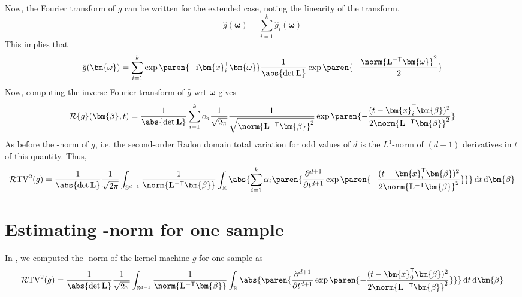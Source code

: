 Now, the Fourier transform of $g$ can be written for the extended case, noting the linearity of the transform,
\[
 \hat{g}(\bm{\omega}) = \sum_{i=1}^k \hat{g}_i(\bm{\omega})
\]
This implies that 
\[
 \hat{g}(\bm{\omega}) = \sum_{i =1}^k \exp\paren{-\mathrm{i}\bm{x}_i^\mathsf{T}\bm{\omega}} \frac{1}{\abs{\det \mathbf{L}}} \exp\paren{-\frac{\norm{\mathbf{L}^{-\mathsf{T}} \bm{\omega}}^2}{2}}
\]
Now, computing the inverse Fourier transform of $\hat{g}$ wrt $\bm{\omega}$ gives 
\[
\mathcal{R}\{g\}(\bm{\beta}, t) = \frac{1}{\abs{\det \mathbf{L}}} \sum_{i=1}^k \alpha_i \frac{1}{\sqrt{2\pi}} \frac{1}{\sqrt{\norm{\mathbf{L}^{-\mathsf{T}}\bm{\beta}}^2}} \exp\paren{-\frac{(t- \bm{x}_i^\mathsf{T}\bm{\beta})^2}{2\norm{\mathbf{L}^{-\mathsf{T}}\bm{\beta}}^2}}
\]
As before the -norm of $g$, i.e. the second-order Radon domain total variation for odd values of $d$ is the $L^1$-norm of $(d+1)$ derivatives in $t$ of this quantity. Thus,
\[
\mathcal{R}\mathrm{TV}^2(g) = \frac{1}{\abs{\det \mathbf{L}}} \frac{1}{\sqrt{2\pi}} \int_{\mathbb{S}^{d-1}} \frac{1}{{\norm{\mathbf{L}^{-\mathsf{T}}\bm{\beta}}}} 
    \int_\mathbb{R}
    \abs{\sum_{i=1}^k \alpha_i \paren{\frac{\partial^{d+1}}{\partial t^{d+1}} \exp\paren{-\frac{(t-\bm{x}_i^\mathsf{T}\bm{\beta})^2}{2\norm{\mathbf{L}^{-\mathsf{T}}\bm{\beta}}^2}}}} \,\mathrm{d}t\,\mathrm{d}\bm{\beta}
\]

\iffalse
\section{Estimating -norm for one sample}

In , we computed the -norm of the kernel machine $g$ for one sample as
\begin{equation}
\mathcal{R}\mathrm{TV}^2(g) = \frac{1}{\abs{\det \mathbf{L}}} \frac{1}{\sqrt{2\pi}} \int_{\mathbb{S}^{d-1}} \frac{1}{{\norm{\mathbf{L}^{-\mathsf{T}}\bm{\beta}}}} 
    \int_\mathbb{R}
    \abs{ \paren{\frac{\partial^{d+1}}{\partial t^{d+1}} \exp\paren{-\frac{(t-\bm{x}_0^\mathsf{T}\bm{\beta})^2}{2\norm{\mathbf{L}^{-\mathsf{T}}\bm{\beta}}^2}}}} \,\mathrm{d}t\,\mathrm{d}\bm{\beta} \label{eq: tv}
\end{equation}

